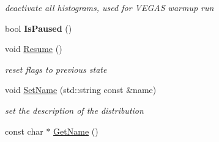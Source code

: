 \begin{DoxyCompactItemize}
\begin{DoxyCompactList}\small\item\em deactivate all histograms, used for V\-E\-G\-A\-S warmup run \end{DoxyCompactList}\item 
\hypertarget{classHistArray_a29c4b8cbb3613f5220e32be5559c55d7}{bool {\bfseries Is\-Paused} ()}\label{classHistArray_a29c4b8cbb3613f5220e32be5559c55d7}

\item 
\hypertarget{classHistArray_ab6afeb98498add41c6f810eb68ed28ba}{void \hyperlink{classHistArray_ab6afeb98498add41c6f810eb68ed28ba}{Resume} ()}\label{classHistArray_ab6afeb98498add41c6f810eb68ed28ba}

\begin{DoxyCompactList}\small\item\em reset flags to previous state \end{DoxyCompactList}\item 
\hypertarget{classHistArray_af40b91f1863ab8e68bdf2ac11e8f9767}{void \hyperlink{classHistArray_af40b91f1863ab8e68bdf2ac11e8f9767}{Set\-Name} (std\-::string const \&name)}\label{classHistArray_af40b91f1863ab8e68bdf2ac11e8f9767}

\begin{DoxyCompactList}\small\item\em set the description of the distribution \end{DoxyCompactList}\item 
\hypertarget{classHistArray_a9fc7b2ffd135531fee3bdb47c4c00c2b}{const char $\ast$ \hyperlink{classHistArray_a9fc7b2ffd135531fee3bdb47c4c00c2b}{Get\-Name} ()}\label{classHistArray_a9fc7b2ffd135531fee3bdb47c4c00c2b}


\end{DoxyCompactItemize}
